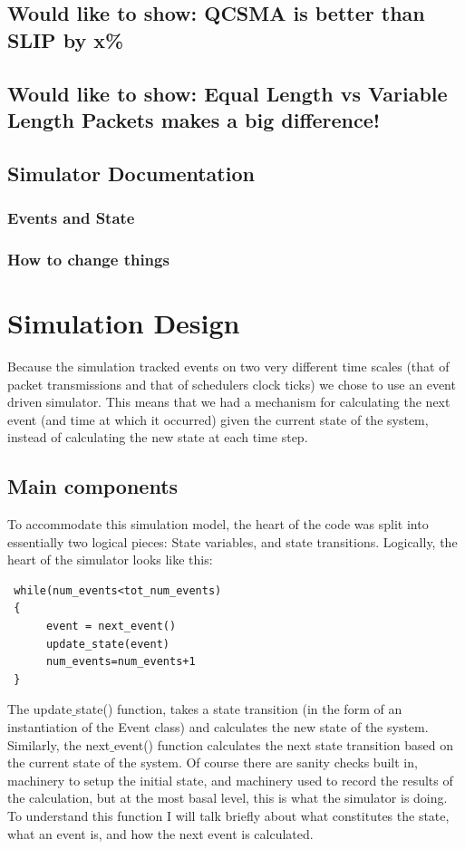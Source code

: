 \documentclass{IEEEtran}%
\begin{document}
\subsection{Would like to show: QCSMA is better than SLIP by x\%}
\subsection{Would like to show: Equal Length vs Variable Length Packets makes a big difference!}
\subsection{Simulator Documentation}
\subsubsection{Events and State}
\subsubsection{How to change things}


\label{bib}
{}
 
 
  \appendices 
 \section{Simulation Design} \label{code_design}
 
 Because the simulation tracked events on two very different time scales (that of packet transmissions and that of schedulers clock ticks) we chose to use an event driven simulator.  This means that we had a mechanism for calculating the next event (and time at which it occurred) given the current state of the system, instead of calculating the new state at each time step.
 
 \subsection{Main components}
 To accommodate this simulation model, the heart of the code was split into essentially two logical pieces: State variables, and state transitions.  Logically, the heart of the simulator looks like this:
 \begin{verbatim}
 while(num_events<tot_num_events)
 {
      event = next_event()
      update_state(event)
      num_events=num_events+1
 }
 \end{verbatim}
 The update$\_$state() function, takes a state transition (in the form of an instantiation of the Event class) and calculates the new state of the system.  Similarly, the next$\_$event() function calculates the next state transition based on the current state of the system.  Of course there are sanity checks built in, machinery to setup the initial state, and machinery used to record the results of the calculation, but at the most basal level, this is what the simulator is doing.  To understand this function I will talk briefly about what constitutes the state, what an event is, and how the next event is calculated.
 
\end{document}
